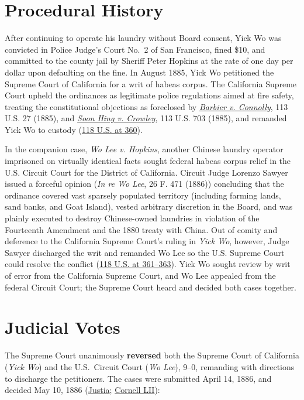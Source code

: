 \documentclass[12pt]{article}
\begin{document}
\section{Procedural History}
After continuing to operate his laundry without Board consent, Yick Wo was convicted in Police Judge's Court No.~2 of San Francisco, fined \$10, and committed to the county jail by Sheriff Peter Hopkins at the rate of one day per dollar upon defaulting on the fine. In August 1885, Yick Wo petitioned the Supreme Court of California for a writ of habeas corpus. The California Supreme Court upheld the ordinances as legitimate police regulations aimed at fire safety, treating the constitutional objections as foreclosed by \href{https://supreme.justia.com/cases/federal/us/113/27/}{\emph{Barbier v. Connolly}}, 113 U.S. 27 (1885), and \href{https://supreme.justia.com/cases/federal/us/113/703/}{\emph{Soon Hing v. Crowley}}, 113 U.S. 703 (1885), and remanded Yick Wo to custody (\href{https://supreme.justia.com/cases/federal/us/118/356/}{118 U.S. at 360}).

In the companion case, \emph{Wo Lee v. Hopkins}, another Chinese laundry operator imprisoned on virtually identical facts sought federal habeas corpus relief in the U.S. Circuit Court for the District of California. Circuit Judge Lorenzo Sawyer issued a forceful opinion (\emph{In re Wo Lee}, 26 F. 471 (1886)) concluding that the ordinance covered vast sparsely populated territory (including farming lands, sand banks, and Goat Island), vested arbitrary discretion in the Board, and was plainly executed to destroy Chinese-owned laundries in violation of the Fourteenth Amendment and the 1880 treaty with China. Out of comity and deference to the California Supreme Court's ruling in \emph{Yick Wo}, however, Judge Sawyer discharged the writ and remanded Wo Lee so the U.S. Supreme Court could resolve the conflict (\href{https://supreme.justia.com/cases/federal/us/118/356/}{118 U.S. at 361--363}). Yick Wo sought review by writ of error from the California Supreme Court, and Wo Lee appealed from the federal Circuit Court; the Supreme Court heard and decided both cases together.

\section{Judicial Votes}
The Supreme Court unanimously \textbf{reversed} both the Supreme Court of California (\textit{Yick Wo}) and the U.S.\ Circuit Court (\textit{Wo Lee}), 9--0, remanding with directions to discharge the petitioners. The cases were submitted April 14, 1886, and decided May 10, 1886 (\href{https://supreme.justia.com/cases/federal/us/118/356/}{Justia}; \href{https://www.law.cornell.edu/supremecourt/text/118/356}{Cornell LII}):
\end{document}

